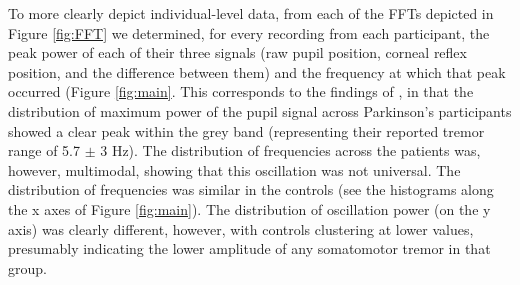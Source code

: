 \documentclass[jou,a4paper]{apa6}
\begin{document}
To more clearly depict individual-level data, from each of the FFTs depicted in Figure \ref{fig:FFT} we determined, for every recording from each participant, the peak power of each of their three signals (raw pupil position, corneal reflex position, and the difference between them) and the frequency at which that peak occurred (Figure \ref{fig:main}. This corresponds to the findings of \citet{Gitchel2012Pervasive-ocula}, in that the distribution of maximum power of the pupil signal across Parkinson's participants showed a clear peak within the grey band (representing their reported tremor range of 5.7 $\pm$ 3 Hz). The distribution of frequencies across the patients was, however, multimodal, showing that this oscillation was not universal. The distribution of frequencies was similar in the controls (see the histograms along the x axes of Figure \ref{fig:main}). The distribution of oscillation power (on the y axis) was clearly different, however, with controls clustering at lower values, presumably indicating the lower amplitude of any somatomotor tremor in that group.
\end{document}
